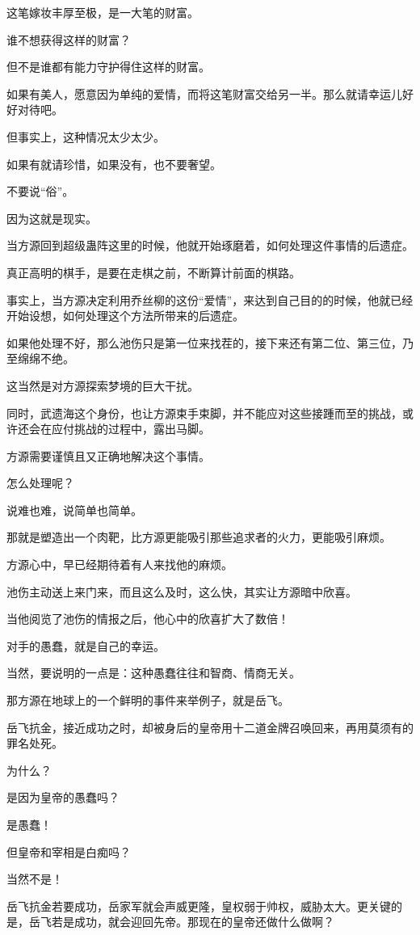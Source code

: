 \begin{this_body}
这笔嫁妆丰厚至极，是一大笔的财富。

谁不想获得这样的财富？

但不是谁都有能力守护得住这样的财富。

如果有美人，愿意因为单纯的爱情，而将这笔财富交给另一半。那么就请幸运儿好好对待吧。

但事实上，这种情况太少太少。

如果有就请珍惜，如果没有，也不要奢望。

不要说“俗”。

因为这就是现实。

当方源回到超级蛊阵这里的时候，他就开始琢磨着，如何处理这件事情的后遗症。

真正高明的棋手，是要在走棋之前，不断算计前面的棋路。

事实上，当方源决定利用乔丝柳的这份“爱情”，来达到自己目的的时候，他就已经开始设想，如何处理这个方法所带来的后遗症。

如果他处理不好，那么池伤只是第一位来找茬的，接下来还有第二位、第三位，乃至绵绵不绝。

这当然是对方源探索梦境的巨大干扰。

同时，武遗海这个身份，也让方源束手束脚，并不能应对这些接踵而至的挑战，或许还会在应付挑战的过程中，露出马脚。

方源需要谨慎且又正确地解决这个事情。

怎么处理呢？

说难也难，说简单也简单。

那就是塑造出一个肉靶，比方源更能吸引那些追求者的火力，更能吸引麻烦。

方源心中，早已经期待着有人来找他的麻烦。

池伤主动送上来门来，而且这么及时，这么快，其实让方源暗中欣喜。

当他阅览了池伤的情报之后，他心中的欣喜扩大了数倍！

对手的愚蠢，就是自己的幸运。

当然，要说明的一点是：这种愚蠢往往和智商、情商无关。

那方源在地球上的一个鲜明的事件来举例子，就是岳飞。

岳飞抗金，接近成功之时，却被身后的皇帝用十二道金牌召唤回来，再用莫须有的罪名处死。

为什么？

是因为皇帝的愚蠢吗？

是愚蠢！

但皇帝和宰相是白痴吗？

当然不是！

岳飞抗金若要成功，岳家军就会声威更隆，皇权弱于帅权，威胁太大。更关键的是，岳飞若是成功，就会迎回先帝。那现在的皇帝还做什么做啊？


\end{this_body}
